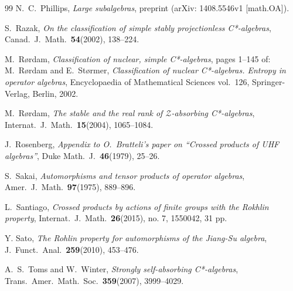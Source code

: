 \documentclass[11pt]{amsart}
\theoremstyle{plain}
\theoremstyle{definition}
\theoremstyle{remark}
\numberwithin{equation}{section}
\begin{document}
\begin{thebibliography}{99}
N.~C.\  Phillips,
{\emph{Large subalgebras}},
preprint (arXiv: 1408.5546v1 [math.OA]).


 S.~Razak,
{\emph{On the classification of simple stably projectionless
  C*-algebras}},
Canad.\  J.\  Math.\  {\textbf{54}}(2002), 138--224.


M.~R{\o}rdam,
{\emph{Classification of nuclear, simple C*-algebras}},
pages 1--145 of:
M.~R{\o}rdam and E.~St{\o}rmer,
{\emph{Classification of nuclear C*-algebras. Entropy in operator
algebras}},
Encyclopaedia of Mathematical Sciences vol.\  126,
Springer-Verlag, Berlin, 2002.

M.~R{\o}rdam,
{\emph{The stable and the real rank of ${\mathcal{Z}}$-absorbing
 C*-algebras}},
Internat.\  J.\  Math.\  {\textbf{15}}(2004), 1065--1084.



J.~Rosenberg,
{\emph{Appendix to O.~Bratteli's paper on
``Crossed products of UHF algebras''}},
Duke Math.~J.\  {\textbf{46}}(1979), 25--26.

S.~Sakai,
{\emph{Automorphisms and tensor products of operator algebras}},
Amer.\  J.\   Math.\  {\textbf{97}}(1975), 889--896.

 L.~Santiago,
{\emph{Crossed products by actions of finite groups
  with the Rokhlin property}},
Internat.\  J.\  Math.\  {\textbf{26}}(2015), no. 7, 1550042, 31 pp.

Y. Sato, \emph{The Rohlin property for automorphisms of the Jiang-Su algebra},
J.~Funct.\  Anal.\  {\textbf{259}}(2010), 453--476.

A.~S.\  Toms and W.~Winter,
{\emph{Strongly self-absorbing C*-algebras}},
Trans.\  Amer.\  Math.\  Soc.\  {\textbf{359}}(2007), 3999--4029.


\end{thebibliography}
\end{document}
